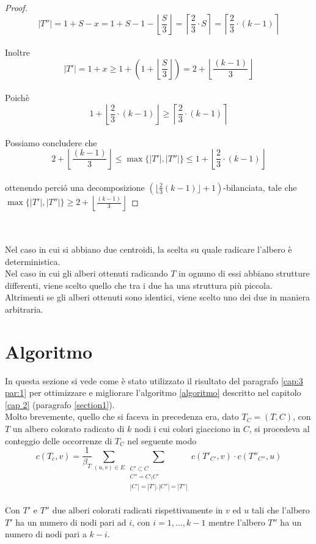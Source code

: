 \begin{proof}
\begin{equation}
|T''| = 1 + S - x = 1+S-1 - \left\lfloor \frac{S}{3}\right\rfloor = \left\lceil \frac{2}{3}\cdot S \right\rceil = \left\lceil \frac{2}{3} \cdot (k-1) \right\rceil 	
\end{equation}
\\
Inoltre
\\
\[ |T'| = 1+ x \ge 1+ (1 +  \left\lfloor \frac{S}{3}\right\rfloor ) = 2 +  \left\lfloor \frac{(k-1)}{3}\right\rfloor\]
\\
Poich\`e
\\
 	 \[1 + \left\lfloor \frac{2}{3} \cdot (k-1) \right\rfloor \ge \left\lceil \frac{2}{3} \cdot (k-1) \right\rceil \] 
 	 \\
Possiamo concludere che
\\
\[ 2 +  \left\lfloor \frac{(k-1)}{3}\right\rfloor \le \max\{|T'|,|T''|\} \le 1 + \left\lfloor \frac{2}{3} \cdot (k-1) \right\rfloor \]
 \\
ottenendo perci\'o una decomposizione $ (\lfloor \frac{2}{3}(k-1) \rfloor +1)$-bilanciata, tale che $ \max \{|T'|,|T''|\} \ge 2+ \left\lfloor \frac{(k-1)}{3}\right\rfloor $	 	 
\end{proof}\mbox{}\\\\
 	Nel caso in cui si abbiano due centroidi, la scelta su quale radicare l'albero  \`e deterministica.\\
 	Nel caso in cui gli alberi ottenuti radicando $ T $ in ognuno di essi abbiano strutture differenti, viene scelto quello che tra i due ha una struttura pi\`u piccola.
 	Altrimenti se gli alberi ottenuti sono identici, viene scelto uno dei due in maniera arbitraria.
 	
\section{Algoritmo}
\label{cap:3 par:2}
In questa sezione si vede come \`e stato utilizzato il risultato del paragrafo \ref{cap:3 par:1} per ottimizzare e migliorare l'algoritmo \ref{algoritmo} descritto nel capitolo \ref{cap 2} (paragrafo \ref{section1}).\\
Molto brevemente, quello che si faceva in precedenza era, dato $ T_C = (T,C) $, con $ T $ un albero colorato radicato di $ k $ nodi i cui colori giacciono in $ C $, si procedeva al conteggio delle occorrenze di $ T_C $ nel seguente modo
\[	c(T_c,v)=\frac{1}{\beta_T}\sum_{(u,v)\in E}\sum_{\substack{C' \subset C \\C'' = C \setminus C' \\ |C'|=|T'|, |C''| = |T''|}}c(T'_{C'},v)\cdot c(T''_{C''},u) \]\\
Con $ T' $ e $ T'' $ due alberi colorati radicati rispettivamente in $ v $ ed $ u $ tali che l'albero $ T' $ ha un numero di nodi pari ad $ i $, con $ i = 1, \dots , k-1 $ mentre l'albero $ T'' $ ha un numero di nodi pari a $ k-i $.

